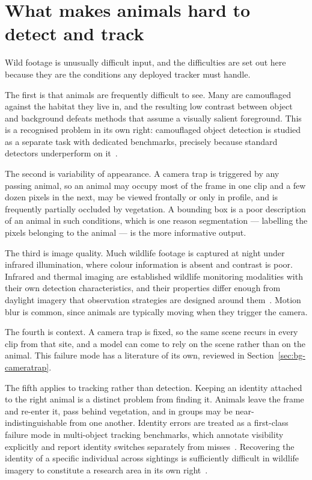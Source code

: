 \section{What makes animals hard to detect and track}
\label{sec:bg-challenges}
Wild footage is unusually difficult input, and the difficulties are set out here because they are the
conditions any deployed tracker must handle.

The first is that animals are frequently difficult to see. Many are camouflaged against the habitat they live
in, and the resulting low contrast between object and background defeats methods that assume a visually
salient foreground. This is a recognised problem in its own right: camouflaged object detection is studied as
a separate task with dedicated benchmarks, precisely because standard detectors underperform on
it~\cite{cod}.

The second is variability of appearance. A camera trap is triggered by any passing animal, so an animal may
occupy most of the frame in one clip and a few dozen pixels in the next, may be viewed frontally or only in
profile, and is frequently partially occluded by vegetation. A bounding box is a poor description of an animal in
such conditions, which is one reason segmentation --- labelling the pixels belonging to the animal --- is the
more informative output.

The third is image quality. Much wildlife footage is captured at night under infrared illumination, where
colour information is absent and contrast is poor. Infrared and thermal imaging are established wildlife
monitoring modalities with their own detection characteristics, and their properties differ enough from
daylight imagery that observation strategies are designed around them~\cite{thermalwildlife}. Motion blur is
common, since animals are typically moving when they trigger the camera.

The fourth is context. A camera trap is fixed, so the same scene recurs in every clip from that site, and a
model can come to rely on the scene rather than on the animal. This failure mode has a literature of its own,
reviewed in Section~\ref{sec:bg-cameratrap}.

The fifth applies to tracking rather than detection. Keeping an identity attached to the right animal is a
distinct problem from finding it. Animals leave the frame and re-enter it, pass behind vegetation, and in
groups may be near-indistinguishable from one another. Identity errors are treated as a first-class failure
mode in multi-object tracking benchmarks, which annotate visibility explicitly and report identity switches
separately from misses~\cite{motchallenge}. Recovering the identity of a specific individual across sightings
is sufficiently difficult in wildlife imagery to constitute a research area in its own right~\cite{animalreid}.

